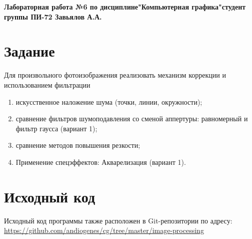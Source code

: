 \documentclass[a4paper,12pt]{article}
\begin{document}

\begin{center}
  \textbf{Лабораторная работа №6 по дисциплине\linebreak"Компьютерная графика"\linebreak{} студент группы ПИ-72 Завьялов А.А.}\\
\end{center}

\section{\normalsize{Задание}}
\begin{flushleft}
    Для произвольного фотоизображения реализовать механизм коррекции и использованием фильтрации

    \begin{enumerate}
        \item искусственное наложение шума (точки, линии, окружности);
        \item сравнение фильтров шумоподавления со сменой аппертуры: равномерный и фильтр гаусса (вариант 1);
        \item сравнение методов повышения резкости;
        \item Применение спецэффектов: Акварелизация (вариант 1).
    \end{enumerate}

\end{flushleft}

\section{\normalsize{Исходный код}}
Исходный код программы также расположен в Git-репозитории по адресу: \url{https://github.com/andiogenes/cg/tree/master/image-processing}
\inputminted[breaklines]{py}{../filters.py}
\end{document}
